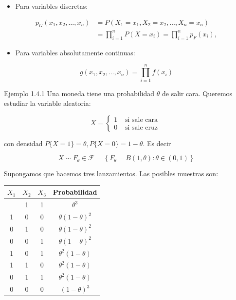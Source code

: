 \documentclass[
]{article}
\providecommand{\tightlist}{%
  \setlength{\itemsep}{0pt}\setlength{\parskip}{0pt}}
\begin{document}
\begin{itemize}
\tightlist
\item
  Para variables discretas:
\end{itemize}

\[
\begin{aligned}
p_{G}\left(x_{1}, x_{2}, \ldots, x_{n}\right) & =P\left(X_{1}=x_{1}, X_{2}=x_{2}, \ldots, X_{n}=x_{n}\right) \\
& =\prod_{i=1}^{n} P\left(X=x_{i}\right)=\prod_{i=1}^{n} p_{F}\left(x_{i}\right),
\end{aligned}
\]

\begin{itemize}
\tightlist
\item
  Para variables absolutamente continuas:
\end{itemize}

\[
g\left(x_{1}, x_{2}, \ldots, x_{n}\right)=\prod_{i=1}^{n} f\left(x_{i}\right)
\]

Ejemplo 1.4.1 Una moneda tiene una probabilidad \(\theta\) de salir cara. Queremos estudiar la variable aleatoria:

\[
X= \begin{cases}1 & \text { si sale cara } \\ 0 & \text { si sale cruz }\end{cases}
\]

con densidad \(P\{X=1\}=\theta, P\{X=0\}=1-\theta\). Es decir

\[
X \sim F_{\theta} \in \mathcal{F}=\left\{F_{\theta}=B(1, \theta): \theta \in(0,1)\right\}
\]

Supongamos que hacemos tres lanzamientos. Las posibles muestras son:

\begin{longtable}[]{@{}cccc@{}}
\toprule\noalign{}
\(X_{1}\) & \(X_{2}\) & \(X_{3}\) & Probabilidad \\
\midrule\noalign{}
\endhead
\bottomrule\noalign{}
\endlastfoot
1 & 1 & 1 & \(\theta^{3}\) \\
1 & 0 & 0 & \(\theta(1-\theta)^{2}\) \\
0 & 1 & 0 & \(\theta(1-\theta)^{2}\) \\
0 & 0 & 1 & \(\theta(1-\theta)^{2}\) \\
1 & 0 & 1 & \(\theta^{2}(1-\theta)\) \\
1 & 1 & 0 & \(\theta^{2}(1-\theta)\) \\
0 & 1 & 1 & \(\theta^{2}(1-\theta)\) \\
0 & 0 & 0 & \((1-\theta)^{3}\) \\
\end{longtable}
\end{document}
